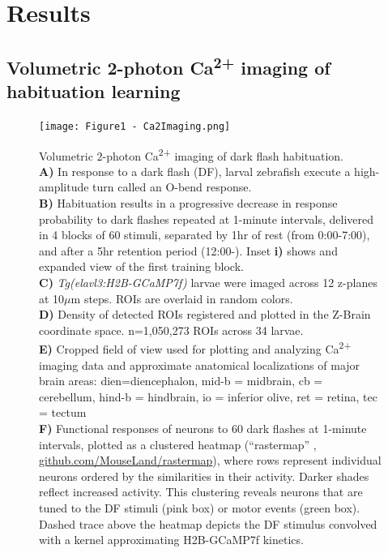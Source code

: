 \documentclass[9pt,lineno]{RandlettLab_elife}
\begin{document}
\section{Results}

\subsection{Volumetric 2-photon Ca\textsuperscript{2+} imaging of habituation learning}
\vspace{3mm}

\begin{figure}
\begin{fullwidth}
\begin{center}
\texttt{[image: Figure1 - Ca2Imaging.png]}
\caption{Volumetric 2-photon Ca\textsuperscript{2+} imaging of dark flash habituation.
\\ \textbf{A)} In response to a dark flash (DF), larval zebrafish execute a high-amplitude turn called an O-bend response.
\\ \textbf{B)} Habituation results in a progressive decrease in response probability to dark flashes repeated at 1-minute intervals, delivered in 4 blocks of 60 stimuli, separated by 1hr of rest (from 0:00-7:00), and after a 5hr retention period (12:00-). Inset \textbf{i)} shows and expanded view of the first training block.  
\\ \textbf{C)} \textit{Tg(elavl3:H2B-GCaMP7f)} larvae were imaged across 12 z-planes at 10$\mu$m steps. ROIs are overlaid in random colors. 
\\ \textbf{D)} Density of detected ROIs registered and plotted in the Z-Brain coordinate space. n=1,050,273 ROIs across 34 larvae. 
\\ \textbf{E)} Cropped field of view used for  plotting and analyzing Ca\textsuperscript{2+} imaging data and approximate anatomical localizations of major brain areas: dien=diencephalon, mid-b = midbrain, cb = cerebellum, hind-b = hindbrain, io = inferior olive, ret = retina, tec = tectum
\\ \textbf{F)} Functional responses of neurons to 60 dark flashes at 1-minute intervals, plotted as a clustered heatmap (“rastermap” \citep{Pachitariu2017-ad}, \href{https://github.com/MouseLand/rastermap}{github.com/MouseLand/rastermap}), where rows represent individual neurons ordered by the similarities in their activity. Darker shades reflect increased activity. This clustering reveals neurons that are tuned to the DF stimuli (pink box) or motor events (green box). Dashed trace above the heatmap depicts the DF stimulus convolved with a kernel approximating H2B-GCaMP7f kinetics.
}
\end{center}
\end{fullwidth}
\end{figure}
\end{document}
